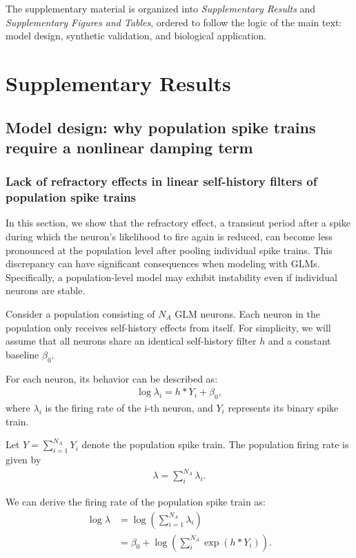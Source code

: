 \documentclass[12pt]{article}
\begin{document}
The supplementary material is organized into \emph{Supplementary Results} and \emph{Supplementary Figures and Tables}, ordered to follow the logic of the main text: model design, synthetic validation, and biological application.

\section*{Supplementary Results}

\subsection*{Model design: why population spike trains require a nonlinear damping term}


\subsubsection*{Lack of refractory effects in linear self-history filters of population spike trains}
\label{Sec:lack_of_refractory}

In this section, we show that the refractory effect, a transient period after a spike during which the neuron's likelihood to fire again is reduced, can become less pronounced at the population level after pooling individual spike trains. This discrepancy can have significant consequences when modeling with GLMs. Specifically, a population-level model may exhibit instability even if individual neurons are stable.

Consider a population consisting of $N_A$ GLM neurons. Each neuron in the population only receives self-history effects from itself. For simplicity, we will assume that all neurons share an identical self-history filter $h$ and a constant baseline $\beta_0$. 

For each neuron, its behavior can be described as:
\begin{align}
\log \lambda_i = h*Y_i + \beta_0,
\end{align}
where $\lambda_i$ is the firing rate of the i-th neuron, and $Y_i$ represents its binary spike train.

Let $Y=\sum_{i=1}^{N_A} Y_i$ denote the population spike train. The population firing rate is given by 
\begin{align}
\lambda=\sum_i^{N_A} \lambda_i.
\end{align}

We can derive the firing rate of the population spike train as:
\begin{align}
\log \lambda &= \log \left ( \sum_{i=1}^{N_A} \lambda_i \right ) \\
&= \beta_0  + \log \left ( \sum_i^{N_A} \exp(h*Y_i)  \right ).
\end{align}
\end{document}
